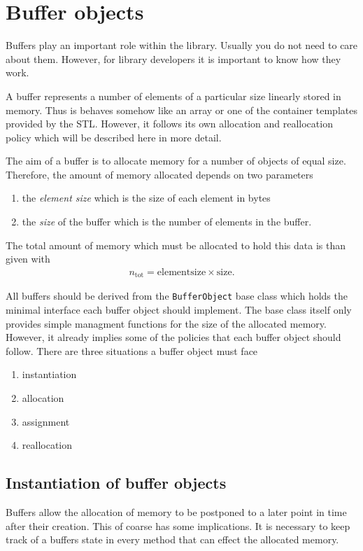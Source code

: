\section{Buffer objects}
Buffers play an important role within the library. Usually you do not need 
to care about them. However, for library developers it is important 
to know how they work.

A buffer represents a number of elements of a particular size linearly 
stored in memory. Thus is behaves somehow like an array or one of the 
container templates provided by the STL. However, it follows its own 
allocation and reallocation policy which will be described here in more detail.  

The aim of a buffer is to allocate memory for a number of objects of equal 
size. Therefore, the amount of memory allocated depends on two parameters
\begin{enumerate}
  \item the {\em element size } which is the size of each element in bytes
  \item the {\em size } of the buffer which is the number of elements in the
  buffer.
\end{enumerate}
The total amount of memory which must be allocated to hold this data is 
than given with
\begin{align}
n_{\mathrm{tot}} = \mathrm{element size}\times\mathrm{size}.
\end{align}

All buffers should be derived from the {\tt BufferObject} base class which 
holds the minimal interface each buffer object should implement. 
The base class itself only provides simple managment functions for the
size of the allocated memory. However, it already implies some of the 
policies that each buffer object should follow. 
There are three situations a buffer object must face
\begin{enumerate}
  \item instantiation
  \item allocation
  \item assignment
  \item reallocation
\end{enumerate} 

\subsection{Instantiation of buffer objects}

Buffers allow the allocation of memory to be postponed to a later point in 
time after their creation. This of coarse has some implications. 
It is necessary to keep track of a buffers state in every method that 
can effect the allocated memory. 

